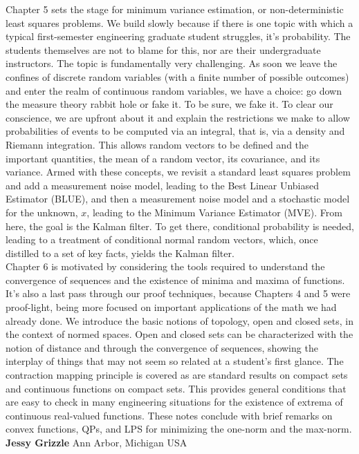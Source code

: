 Chapter 5 sets the stage for minimum variance estimation, or non-deterministic least squares problems. We build slowly because if there is one topic with which a typical first-semester engineering graduate student struggles, it's probability. The students themselves are not to blame for this, nor are their undergraduate instructors. The topic is fundamentally very challenging. As soon we leave the confines of discrete random variables (with a finite number of possible outcomes) and enter the realm of continuous random variables, we have a choice: go down the measure theory rabbit hole or fake it. To be sure, we fake it. To clear our conscience, we are upfront about it and explain the restrictions we make to allow probabilities of events to be computed via an integral, that is, via a density and Riemann integration. This allows random vectors to be defined and the important quantities, the mean of a random vector, its covariance, and its variance. Armed with these concepts, we revisit a standard least squares problem and add a measurement noise model, leading to the Best Linear Unbiased Estimator (BLUE), and then a measurement noise model and a stochastic model for the unknown, $x$, leading to the Minimum Variance Estimator (MVE). From here, the goal is the Kalman filter. To get there, conditional probability is needed, leading to a treatment of conditional normal random vectors, which, once distilled to a set of key facts, yields the Kalman filter.\\

Chapter 6 is motivated by considering the tools required to understand the convergence of sequences and the existence of minima and maxima of functions. It's also a last pass through our proof techniques, because Chapters 4 and 5 were proof-light, being more focused on important applications of the math we had already done. We introduce the basic notions of topology, open and closed sets, in the context of normed spaces. Open and closed sets can be characterized with the notion of distance and through the convergence of sequences, showing the interplay of things that may not seem so related at a student's first glance. The contraction mapping principle is covered as are standard results on compact sets and continuous functions on compact sets. This provides general conditions that are easy to check in many engineering situations for the existence of extrema of continuous real-valued functions. These notes conclude with brief remarks on convex functions, QPs, and LPS for minimizing the one-norm and the max-norm.\\

\textbf{Jessy Grizzle}
Ann Arbor, Michigan USA